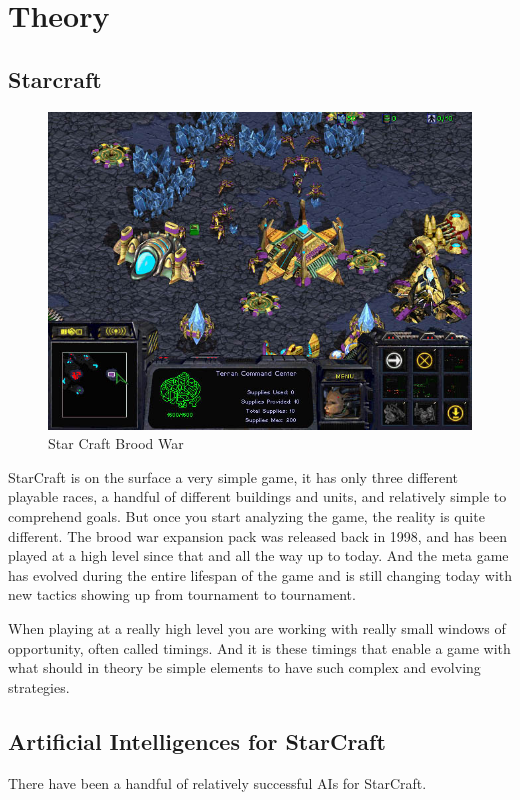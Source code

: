 
\chapter{Theory}
\section{Starcraft}

\begin{figure}[h!tb]
\centering
\includegraphics[scale=0.5]{graphics/scbw.jpg}
\caption{Star Craft Brood War \cite{test}}
\label{fig:scbwIntro}
\end{figure}
StarCraft is on the surface a very simple game, it has only three different playable races, a
handful of different buildings and units, and relatively simple to comprehend
goals. But once you start analyzing the game, the reality is quite different. The brood war expansion pack was released back in 1998, and has been played at a high level since that and all the way up to today. And the meta game has evolved during the entire lifespan of the game and is still changing today with new tactics showing up from tournament to tournament.
\cite{blizzardstarcraft}

When playing at a really high level you are working with really small windows of opportunity, often called timings. And it is these timings that enable a game with what should in theory be simple elements to have such complex and evolving strategies. 


\section{Artificial Intelligences for StarCraft}
There have been a handful of relatively successful AIs for StarCraft.

